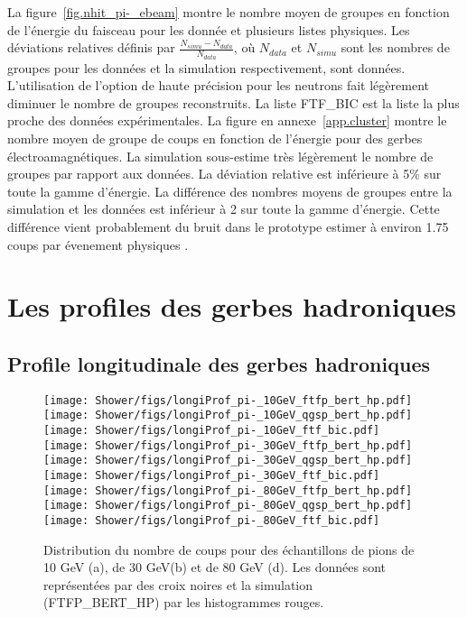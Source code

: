 La figure~\ref{fig.nhit_pi-_ebeam} montre le nombre moyen de groupes en fonction de l'énergie du faisceau pour les donnée et plusieurs listes physiques. Les déviations relatives définis par $\frac{N_{simu}-N_{data}}{N_{data}}$, où $N_{data}$ et $N_{simu}$ sont les nombres de groupes pour les données et la simulation respectivement, sont données. L'utilisation de l'option de haute précision pour les neutrons fait légèrement diminuer le nombre de groupes reconstruits. La liste FTF\_BIC est la liste la plus proche des données expérimentales. La figure en annexe~\ref{app.cluster} montre le nombre moyen de groupe de coups en fonction de l'énergie pour des gerbes électroamagnétiques. La simulation sous-estime très légèrement le nombre de groupes par rapport aux données. La déviation relative est inférieure à 5$\%$ sur toute la gamme d'énergie. La différence des nombres moyens de groupes entre la simulation et les données est inférieur à 2 sur toute la gamme d'énergie. Cette différence vient probablement du bruit dans le prototype estimer à environ 1.75 coups par évenement physiques \cite{sdhcal-com}.


\section{Les profiles des gerbes hadroniques}
\label{sec.Profile}
\subsection{Profile longitudinale des gerbes hadroniques}
\label{sec.longiProfile}
\begin{figure}[!ht]
  \texttt{[image: Shower/figs/longiProf\_pi-\_10GeV\_ftfp\_bert\_hp.pdf]}
  \texttt{[image: Shower/figs/longiProf\_pi-\_10GeV\_qgsp\_bert\_hp.pdf]}
  \texttt{[image: Shower/figs/longiProf\_pi-\_10GeV\_ftf\_bic.pdf]}\\
  \texttt{[image: Shower/figs/longiProf\_pi-\_30GeV\_ftfp\_bert\_hp.pdf]}
  \texttt{[image: Shower/figs/longiProf\_pi-\_30GeV\_qgsp\_bert\_hp.pdf]}
  \texttt{[image: Shower/figs/longiProf\_pi-\_30GeV\_ftf\_bic.pdf]}\\
  \texttt{[image: Shower/figs/longiProf\_pi-\_80GeV\_ftfp\_bert\_hp.pdf]}
  \texttt{[image: Shower/figs/longiProf\_pi-\_80GeV\_qgsp\_bert\_hp.pdf]}
  \texttt{[image: Shower/figs/longiProf\_pi-\_80GeV\_ftf\_bic.pdf]}
  \caption{Distribution du nombre de coups pour des échantillons de pions de 10 GeV (a), de 30 GeV(b) et de 80 GeV (d). Les données sont représentées par des croix noires et la simulation (FTFP\_BERT\_HP) par les histogrammes rouges. \label{fig.pi-nhit}}
\end{figure}


